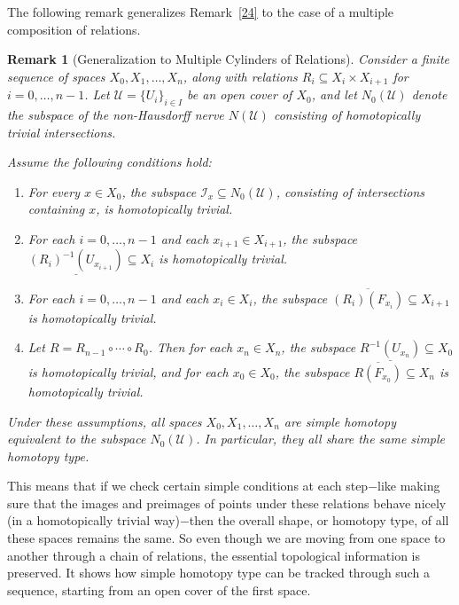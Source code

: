 \documentclass[12pt,a4paper,twoside, reqno, tbtags]{article}
\numberwithin{equation}{section}
\newtheorem{remark}{Remark}[section]
\begin{document}
    \noindent The following remark generalizes Remark~\ref{24} to the case of a multiple composition of relations.

\begin{remark}[Generalization to Multiple Cylinders of Relations]\label{25}
	 Consider a finite sequence of spaces \( X_0, X_1, \dots, X_n \), along with relations \( R_i \subseteq X_i \times X_{i+1} \) for \( i = 0, \dots, n-1 \). Let \( \mathcal{U} = \{U_i\}_{i \in I} \) be an open cover of \( X_0 \), and let \( N_0(\mathcal{U}) \) denote the subspace of the non-Hausdorff nerve \( N(\mathcal{U}) \) consisting of homotopically trivial intersections.
	
	Assume the following conditions hold:
	\begin{enumerate}
		\item For every \( x \in X_0 \), the subspace \( \mathcal{I}_x \subseteq N_0(\mathcal{U}) \), consisting of intersections containing \( x \), is homotopically trivial.
		\item For each \( i = 0, \dots, n-1 \) and each \( x_{i+1} \in X_{i+1} \), the subspace \( \underline{(R_i)^{-1}(U_{x_{i+1}})} \subseteq X_i \) is homotopically trivial.
		\item For each \( i = 0, \dots, n-1 \) and each \( x_i \in X_i \), the subspace \( \overline{(R_i)(F_{x_i})} \subseteq X_{i+1} \) is homotopically trivial.
		\item Let \( R = R_{n-1} \circ \cdots \circ R_0 \). Then for each \( x_n \in X_n \), the subspace \( \underline{R^{-1}(U_{x_n})} \subseteq X_0 \) is homotopically trivial, and for each \( x_0 \in X_0 \), the subspace \( \overline{R(F_{x_0})} \subseteq X_n \) is homotopically trivial.
	\end{enumerate}
	
	Under these assumptions, all spaces \( X_0, X_1, \dots, X_n \) are simple homotopy equivalent to the subspace \( N_0(\mathcal{U}) \). In particular, they all share the same simple homotopy type.
\end{remark}
    \noindent This means that if we check certain simple conditions at each step$-$like making sure that the images and preimages of points under these relations behave nicely (in a homotopically trivial way)$-$then the overall shape, or homotopy type, of all these spaces remains the same. So even though we are moving from one space to another through a chain of relations, the essential topological information is preserved. It shows how simple homotopy type can be tracked through such a sequence, starting from an open cover of the first space.
\end{document}
